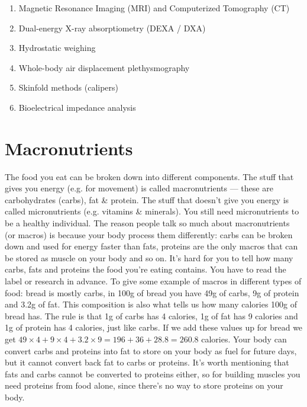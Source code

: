\documentclass[openany, 12pt]{book}
\begin{document}
	\begin{enumerate}
		\item Magnetic Resonance Imaging (MRI) and Computerized Tomography (CT)
		\item Dual-energy X-ray absorptiometry (DEXA / DXA)
		\item Hydrostatic weighing
		\item Whole-body air displacement plethysmography
		\item Skinfold methods (calipers)
		\item Bioelectrical impedance analysis
	\end{enumerate}
	
	\section{Macronutrients}
	
	The food you eat can be broken down into different components. The stuff that gives you energy (e.g. for movement) is called macronutrients --- these are carbohydrates
	(carbs), fat \& protein. The stuff that doesn't give you energy is called micronutrients (e.g. vitamins \& minerals). You still need micronutrients to be a healthy individual.
	The reason people talk so much about macronutrients (or macros) is because your body process them differently: carbs can be broken down and used for energy faster than fats,
	proteins are the only macros that can be stored as muscle on your body and so on. It's hard for you to tell how many carbs, fats and proteins the food you're eating contains.
	You have to read the label or research in advance. To give some example of macros in different types of food: bread is mostly carbs, in 100g of bread you have 49g of carbs,
	9g of protein and 3.2g of fat. This composition is also what tells us how many calories 100g of bread has. The rule is that 1g of carbs has 4 calories, 1g of fat has 9 calories
	and 1g of protein has 4 calories, just like carbs. If we add these values up for bread we get $49 \times 4 + 9 \times 4 + 3.2 \times 9 = 196 + 36 + 28.8 = 260.8$ calories. Your
	body can convert carbs and proteins into fat to store on your body as fuel for future days, but it cannot convert back fat to carbs or proteins. It's worth mentioning that
	fats and carbs cannot be converted to proteins either, so for building muscles you need proteins from food alone, since there's no way to store proteins on your body. 
	
\end{document}
